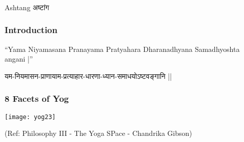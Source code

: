 \begin{frame}[fragile]\frametitle{}
\begin{center}
{\Large Ashtang अष्टांग }
\end{center}
\end{frame}


\begin{frame}[fragile]\frametitle{Introduction}
``Yama Niyamasana Pranayama Pratyahara Dharanadhyana Samadhyoshta angani |''

यम-नियमासन-प्राणायाम-प्रत्याहार-धारणा-ध्यान-समाधयोऽष्टवङ्गानि ||

\end{frame}


\begin{frame}[fragile]\frametitle{8 Facets of Yog}

\begin{center}
\texttt{[image: yog23]}

\tiny{(Ref: Philosophy III - The Yoga SPace - Chandrika Gibson)}
\end{center}

\end{frame}